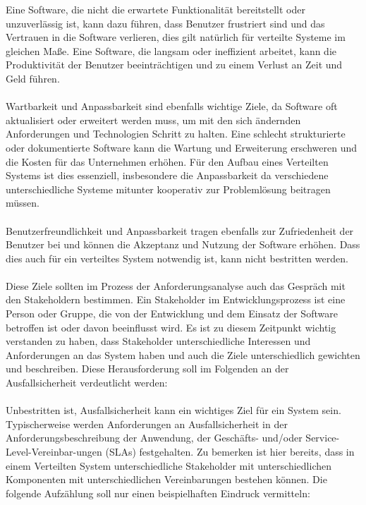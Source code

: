 \documentclass[../vs-script-first-v01.tex]{subfiles}
\begin{document}
Eine Software, die nicht die erwartete Funktionalität bereitstellt oder unzuverlässig ist, kann dazu führen, dass Benutzer frustriert sind und das Vertrauen in die Software verlieren, dies gilt natürlich für verteilte Systeme im gleichen Maße. Eine Software, die langsam oder ineffizient arbeitet, kann die Produktivität der Benutzer beeinträchtigen und zu einem Verlust an Zeit und Geld führen.
\\\\
Wartbarkeit und Anpassbarkeit sind ebenfalls wichtige Ziele, da Software oft aktualisiert oder erweitert werden muss, um mit den sich ändernden Anforderungen und Technologien Schritt zu halten. Eine schlecht strukturierte oder dokumentierte Software kann die Wartung und Erweiterung erschweren und die Kosten für das Unternehmen erhöhen. Für den Aufbau eines Verteilten Systems ist dies essenziell, insbesondere die Anpassbarkeit da verschiedene unterschiedliche Systeme mitunter kooperativ zur Problemlösung beitragen müssen. 
\\\\
Benutzerfreundlichkeit und Anpassbarkeit tragen ebenfalls zur Zufriedenheit der Benutzer bei und können die Akzeptanz und Nutzung der Software erhöhen. Dass dies auch für ein verteiltes System notwendig ist, kann nicht bestritten werden. 
\\\\
Diese Ziele sollten im Prozess der Anforderungsanalyse auch das Gespräch mit den Stakeholdern bestimmen. Ein Stakeholder im Entwicklungsprozess ist eine Person oder Gruppe, die von der Entwicklung und dem Einsatz der Software betroffen ist oder davon beeinflusst wird. 
Es ist zu diesem Zeitpunkt wichtig verstanden zu haben, dass Stakeholder unterschiedliche Interessen und Anforderungen an das System haben und auch die Ziele unterschiedlich gewichten und beschreiben. Diese Herausforderung soll im Folgenden an der Ausfallsicherheit  verdeutlicht werden:
\\\\
Unbestritten ist, Ausfallsicherheit kann ein wichtiges Ziel für ein System sein. Typischerweise werden Anforderungen an Ausfallsicherheit in der Anforderungsbeschreibung der Anwendung, der Geschäfts- und/oder Service-Level-Vereinbar-ungen (SLAs) festgehalten. Zu bemerken ist hier bereits, dass in einem Verteilten System unterschiedliche Stakeholder mit unterschiedlichen Komponenten mit unterschiedlichen Vereinbarungen bestehen können. Die folgende Aufzählung soll nur einen beispielhaften Eindruck vermitteln: 
\end{document}
